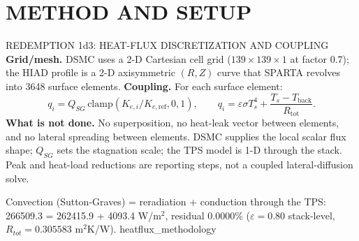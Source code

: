 \documentclass[aspectratio=169,11pt]{beamer}
\begin{document}
\section{METHOD AND SETUP}
\begin{frame}{REDEMPTION 1d3: HEAT-FLUX DISCRETIZATION AND COUPLING}
  \small
  \textbf{Grid/mesh.} DSMC uses a 2-D Cartesian cell grid
  ($139\times139\times1$ at factor 0.7); the HIAD profile is a 2-D
  axisymmetric $(R,Z)$ curve that SPARTA revolves into 3648 surface elements.
  \textbf{Coupling.} For each surface element:
  \[
    q_i=Q_{SG}\,\mathrm{clamp}(K_{e,i}/K_{e,\mathrm{ref}},0,1),
    \qquad
    q_i=\varepsilon\sigma T_s^4+\frac{T_s-T_{\mathrm{back}}}{R_{\mathrm{tot}}}.
  \]
  \textbf{What is not done.} No superposition, no heat-leak vector between
  elements, and no lateral spreading between elements. DSMC supplies the local
  scalar flux shape; $Q_{SG}$ sets the stagnation scale; the TPS model is 1-D
  through the stack. Peak and heat-load reductions are reporting steps, not a
  coupled lateral-diffusion solve.
\end{frame}
  {%
   Convection (Sutton-Graves) = reradiation + conduction through the TPS:
   266509.3 = 262415.9 + 4093.4 W/m$^2$, residual 0.0000\%
   ($\varepsilon=0.80$ stack-level, $R_{tot}=0.305583$ m$^2$K/W).}
  {heatflux_methodology}
\end{document}
